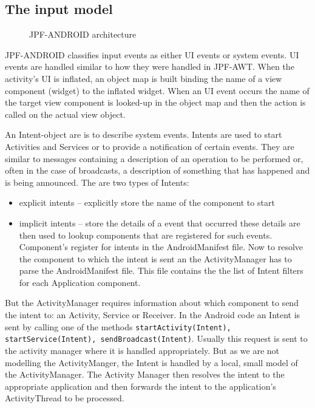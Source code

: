 \documentclass{acm_proc_article-sp}
\begin{document}
\subsection{The input model}
\begin{figure}
\centering
{}
\caption{JPF-ANDROID architecture}
\end{figure}

JPF-ANDROID classifies input events as either UI events or system events. UI events are handled similar to
how they were handled in JPF-AWT. When the activity's UI is inflated, an object map is built binding the name of a view component (widget)
to the inflated widget. When an UI event occurs the name of the target view component is looked-up in the object map
and then the action is called on the actual view object. 

An Intent-object are is to describe system events. Intents are used to start Activities
and Services or to provide a notification of certain events. They are similar to messages containing a description of an operation to be
performed or, often in the case of broadcasts, a description of something that has happened and is being announced. The are two types of
Intents:
\begin{itemize}
 \item explicit intents -- explicitly store the name of the component to start
 \item implicit intents -- store the details of a event that occurred these details are then used to lookup components that are registered
for such events. Component's register for intents in the AndroidManifest file. Now to resolve the component to which the intent is sent an
the ActivityManager has to parse the AndroidManifest file. This file contains the the list of Intent filters for each
Application component. 
\end{itemize}

But the ActivityManager requires information about which component to send the intent to: an Activity, Service or Receiver. In the Android
code
an Intent is sent by calling one of the methods \texttt{startActivity(Intent), startService(Intent), sendBroadcast(Intent)}. Usually this
request is sent to the activity manager where it is handled appropriately. But as we are not modelling the
ActivityManger, the Intent is handled by a local, small model of the ActivityManager. The Activity Manager then resolves the intent to the
appropriate application and then forwards the intent to the application's ActivityThread to be processed.
\end{document}
